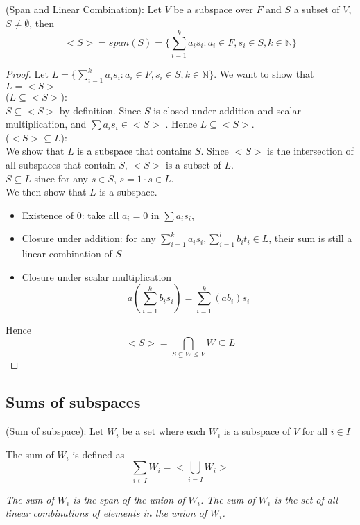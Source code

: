 \begin{theorem}
(Span and Linear Combination): Let $V$ be a subspace over $F$ and $S$ a subset of $V$, $S \neq \emptyset$, then 
\[
  <S> = span(S) = \{ \sum_{i = 1}^{k}a_i s_i: a_i \in F, s_i \in S, k \in \mathbb{N} \} 
\]
\end{theorem}

\begin{proof}
Let $L = \{ \sum_{i = 1}^k a_i s_i: a_i \in F, s_i \in S, k \in \mathbb{N} \} $.  We want to show that $L = <S>$ \\

($L \subseteq <S>$):  \\

$S \subseteq <S>$ by definition. Since $S$  is closed under addition and scalar multiplication, and $\sum a_i s_i \in <S>$ . Hence $L \subseteq <S>$.  \\

($<S> \subseteq L$): \\

We show that $L$ is a subspace that contains $S$. Since $<S>$ is the intersection of all subspaces that contain $S$, $<S>$ is a subset of $L$. \\

$S \subseteq L$ since for any $s \in S$, $s = 1 \cdot s \in L$.  \\

We then show that $L$ is a subspace. \\
\begin{itemize}
\item Existence of $0$: take all $a_i = 0$ in $\sum a_i s_i$,
\item Closure under addition: for any $\sum_{i = 1}^k a_i s_i, \sum_{i = 1}^l b_i t_i \in L$, their sum is still a linear combination of $S$
\item Closure under scalar multiplication
\[
   a \left( \sum_{i = 1}^k b_i s_i \right) = \sum_{i = 1}^k (ab_i) s_i
\]
\end{itemize}

Hence 
\[
  <S> = \bigcap_{S \subseteq W \leq V} W \subseteq L
\]
\end{proof}

\subsection{Sums of subspaces}
\begin{definition}
(Sum of subspace): Let $W_i$ be a set where each $W_i$ is a subspace of $V$ for all $i \in I$ 

The sum of $W_i$ is defined as 
\[
  \sum_{i \in I} W_i = <\bigcup_{i = I} W_i>
\]

\textit{The sum of $W_i$ is the span of the union of $W_i$.}
\textit{The sum of $W_i$ is the set of all linear combinations of elements in the union of $W_i$.}
\end{definition}

